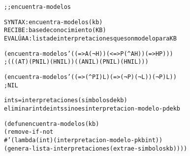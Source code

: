 \begin{aibox}{\function}
\begin{alltt}
;; encuentra-modelos

SYNTAX: encuentra-modelos (kb)
RECIBE   : base de conocimiento (KB)
EVALÚA A : lista de interpretaciones que son modelo para KB

\end{alltt}
\end{aibox}

\begin{aibox}{\examples}
\begin{alltt}
(encuentra-modelos '((=> A (¬ H)) (<=> P (^ A  H)) (=> H P))) 
; (((A T) (P NIL) (H NIL)) ((A NIL) (P NIL) (H NIL)))

(encuentra-modelos '((=> (^ P I)  L)  (=> (¬ P) (¬ L)) (¬ P) L)) 
; NIL

\end{alltt}

\end{aibox}

\begin{aibox}{\comments}

\end{aibox}
\begin{aibox}{\pseudocode}
\begin{alltt}
ints = interpretaciones(simbolos de kb)
eliminar int de ints si no es interpretacion-modelo-p de kb

\end{alltt}
\end{aibox}
\begin{aibox}{\code}

\begin{alltt}

(defun encuentra-modelos (kb) 
  (remove-if-not 
    #'(lambda (int) (interpretacion-modelo-p kb int)) 
    (genera-lista-interpretaciones (extrae-simbolos kb))))

\end{alltt}
\end{aibox}
